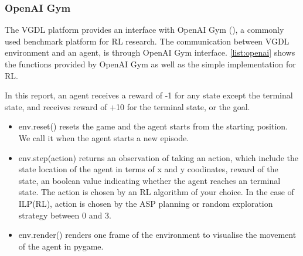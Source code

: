 \subsubsection{OpenAI Gym}
The VGDL platform provides an interface with OpenAI Gym (\cite{Brockman2016}), a commonly used benchmark platform for RL research.
The communication between VGDL environment and an agent, is through OpenAI Gym interface. 
\ref{list:openai} shows the functions provided by OpenAI Gym as well as the simple implementation for RL. 

In this report, an agent receives a reward of -1 for any state except the terminal state, and receives reward of +10 for the terminal state, or the goal.




\begin{itemize}
\item \textsf{env.reset()} resets the game and the agent starts from the starting position. We call it when the agent starts a new episode.
\item \textsf{env.step(action)} returns an observation of taking an action, which include the state location of the agent in terms of x and y coodinates, reward of the state, an boolean value indicating whether the agent reaches an terminal state.
The action is chosen by an RL algorithm of your choice. In the case of ILP(RL), action is chosen by the ASP planning or random exploration strategy between 0 and 3.
\item \textsf{env.render()} renders one frame of the environment to visualise the movement of the agent in pygame.
\end{itemize}









